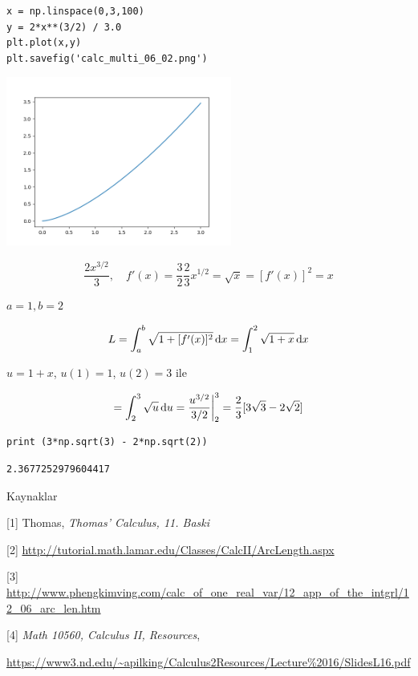 \documentclass[12pt,fleqn]{article}\usepackage{../../common}
\begin{document}
\begin{verbatim}
x = np.linspace(0,3,100)
y = 2*x**(3/2) / 3.0
plt.plot(x,y)
plt.savefig('calc_multi_06_02.png')
\end{verbatim}

\includegraphics[width=20em]{calc_multi_06_02.png}

$$
 \frac{2 x ^{3/2}}{3}, \quad f'(x) = \frac{3}{2} \frac{2}{3} x^{1/2} =
 \sqrt{x} = [f'(x)]^2 = x
$$

$a=1,b=2$

$$
L = \int_{a}^{b} \sqrt{ 1+ [f'(x)]^2} \,\mathrm{d} x = 
\int_{1}^{2} \sqrt{1 + x} \,\mathrm{d} x
$$

$u = 1 + x$, $u(1) = 1$, $u(2) = 3$ ile

$$
= \int_{2}^{3} \sqrt{u} \,\mathrm{d} u = \frac{u^{3/2}}{3/2} \bigg\vert_{2}^{3} = 
\frac{2}{3} [3 \sqrt{3} - 2\sqrt{2} ]
$$


\begin{verbatim}
print (3*np.sqrt(3) - 2*np.sqrt(2))
\end{verbatim}

\begin{verbatim}
2.3677252979604417
\end{verbatim}

Kaynaklar

[1] Thomas, {\em Thomas' Calculus, 11. Baski}

[2] \url{http://tutorial.math.lamar.edu/Classes/CalcII/ArcLength.aspx}

[3] 
\url{http://www.phengkimving.com/calc_of_one_real_var/12_app_of_the_intgrl/12_06_arc_len.htm}

[4] {\em Math 10560, Calculus II, Resources}, 
    
\url{https://www3.nd.edu/~apilking/Calculus2Resources/Lecture%2016/SlidesL16.pdf}
\end{document}
